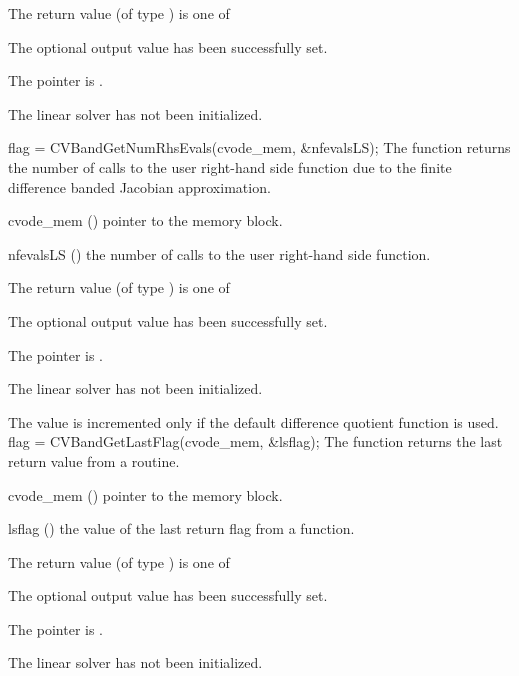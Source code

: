 {
  The return value  (of type ) is one of
  \begin{args}
  \item[\Id{CVBAND\_SUCCESS}] 
    The optional output value has been successfully set.
  \item[\Id{CVBAND\_MEM\_NULL}]
    The  pointer is .
  \item[\Id{CVBAND\_LMEM\_NULL}]
    The {\cvband} linear solver has not been initialized.
  \end{args}
}
{}
{
  flag = CVBandGetNumRhsEvals(cvode\_mem, \&nfevalsLS);
}
{
  The function  returns the
  number of calls to the user right-hand side function due to the 
  finite difference banded Jacobian approximation.
}
{
  \begin{args}
  \item[cvode\_mem] ()
    pointer to the {\cvode} memory block.
  \item[nfevalsLS] ()
    the number of calls to the user right-hand side function.
  \end{args}
}
{
  The return value  (of type ) is one of
  \begin{args}
  \item[\Id{CVBAND\_SUCCESS}] 
    The optional output value has been successfully set.
  \item[\Id{CVBAND\_MEM\_NULL}]
    The  pointer is .
  \item[\Id{CVBAND\_LMEM\_NULL}]
    The {\cvband} linear solver has not been initialized.
  \end{args}
}
{
  The value  is incremented only if the default 
   difference quotient function is used.
}
{
  flag = CVBandGetLastFlag(cvode\_mem, \&lsflag);
}
{
  The function  returns the
  last return value from a {\cvband} routine. 
}
{
  \begin{args}
  \item[cvode\_mem] ()
    pointer to the {\cvode} memory block.
  \item[lsflag] ()
    the value of the last return flag from a {\cvband} function.
  \end{args}
}
{
  The return value  (of type ) is one of
  \begin{args}
  \item[\Id{CVBAND\_SUCCESS}] 
    The optional output value has been successfully set.
  \item[\Id{CVBAND\_MEM\_NULL}]
    The  pointer is .
  \item[\Id{CVBAND\_LMEM\_NULL}]
    The {\cvband} linear solver has not been initialized.
  \end{args}
}
